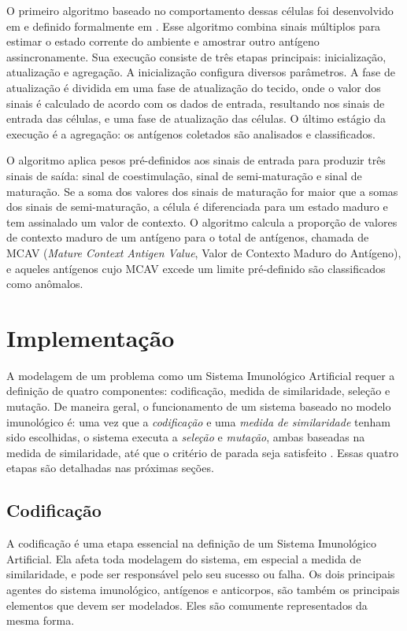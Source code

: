O primeiro algoritmo baseado no comportamento dessas células foi desenvolvido em \citet{Greensmith2005} e definido formalmente em \citet{Greensmith2006}. Esse algoritmo combina sinais múltiplos para estimar o estado corrente do ambiente e amostrar outro antígeno assincronamente. Sua execução consiste de três etapas principais: inicialização, atualização e agregação. A inicialização configura diversos parâmetros. A fase de atualização é dividida em uma fase de atualização do tecido, onde o valor dos sinais é calculado de acordo com os dados de entrada, resultando nos sinais de entrada das células, e uma fase de atualização das células. O último estágio da execução é a agregação: os antígenos coletados são analisados e classificados.

O algoritmo aplica pesos pré-definidos aos sinais de entrada para produzir três sinais de saída: sinal de coestimulação, sinal de semi-maturação e sinal de maturação. Se a soma dos valores dos sinais de maturação for maior que a somas dos sinais de semi-maturação, a célula é diferenciada para um estado maduro e tem assinalado um valor de contexto. O algoritmo calcula a proporção de valores de contexto maduro de um antígeno para o total de antígenos, chamada de MCAV (\emph{Mature Context Antigen Value}, Valor de Contexto Maduro do Antígeno), e aqueles antígenos cujo MCAV excede um limite pré-definido são classificados como anômalos.

\section{Implementação}

A modelagem de um problema como um Sistema Imunológico Artificial requer a definição de quatro componentes: codificação, medida de similaridade, seleção e mutação. De maneira geral, o funcionamento de um sistema baseado no modelo imunológico é: uma vez que a \emph{codificação} e uma \emph{medida de similaridade} tenham sido escolhidas, o sistema executa a \emph{seleção} e \emph{mutação}, ambas baseadas na medida de similaridade, até que o critério de parada seja satisfeito \cite{Aickelin2005}. Essas quatro etapas são detalhadas nas próximas seções.

\subsection{Codificação}

A codificação é uma etapa essencial na definição de um Sistema Imunológico Artificial. Ela afeta toda modelagem do sistema, em especial a medida de similaridade, e pode ser responsável pelo seu sucesso ou falha. Os dois principais agentes do sistema imunológico, antígenos e anticorpos, são também os principais elementos que devem ser modelados. Eles são comumente representados da mesma forma.

